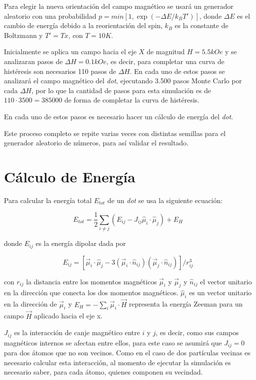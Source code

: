 Para elegir la nueva orientación del campo magnético se usará un generador aleatorio con una probabilidad $p = min[1, \exp(-\Delta E/k_BT')]$, donde $\Delta E$ es el cambio de energía debido a la reorientación del spin, $k_B$ es la constante de Boltzmann y $T' = Tx$, con $T = 10K$.

Inicialmente se aplica un campo hacia el eje $X$ de magnitud $H=5.5kOe$ y se analizaran pasos de $\Delta H = 0.1kOe$, es decir, para completar una curva de histéresis son necesarios 110 pasos de $\Delta H$. En cada uno de estos pasos se analizará el campo magnético del \emph{dot}, ejecutando 3.500 pasos Monte Carlo por cada $\Delta H$, por lo que la cantidad de pasos para esta simulación es de $110 \cdot 3500 = 385000$ de forma de completar la curva de histéresis.

En cada uno de estos pasos es necesario hacer un cálculo de energía del \emph{dot}.

Este proceso completo se repite varias veces con distintas semillas para el generador aleatorio de números, para así validar el resultado.

\section{Cálculo de Energía}

Para calcular la energía total $E_{tot}$ de un \emph{dot} se usa la siguiente ecuación:

\begin{center}
  $$E_{tot} = \frac{1}{2} \sum_{i \neq j} (E_{ij} - J_{ij} \hat{\mu}_i \cdot \hat{\mu}_j) + E_H$$
\end{center}

\noindent
donde $E_{ij}$ es la energía dipolar dada por

\begin{center}
  $$E_{ij} = [\vec{\mu}_i \cdot \hat{\mu}_j - 3(\vec{\mu}_i \cdot \hat{n}_{ij})(\vec{\mu}_j \cdot \hat{n}_{ij})]/ r^3_{ij}$$
\end{center}

\noindent
con $r_{ij}$ la distancia entre los momentos magnéticos $\vec{\mu}_i$  y $\vec{\mu}_j$ y $\hat{n}_{ij}$ el vector unitario en la dirección que conecta los dos momentos magnéticos. $\hat{\mu}_i$ es un vector unitario en la dirección de $\vec{\mu}_i$ y $E_H = - \sum_i \vec{\mu}_i \cdot \vec{H}$ representa la energía Zeeman para un campo $\vec{H}$ aplicado hacia el eje x.

$J_{ij}$ es la interacción de canje magnético entre $i$ y $j$, es decir, como sus campos magnéticos internos se afectan entre ellos, para este caso se asumirá que $J_{ij} = 0$ para dos átomos que no son vecinos. Como en el caso de dos partículas vecinas es necesario calcular esta interacción, al momento de ejecutar la simulación es necesario saber, para cada átomo, quienes componen su vecindad.
